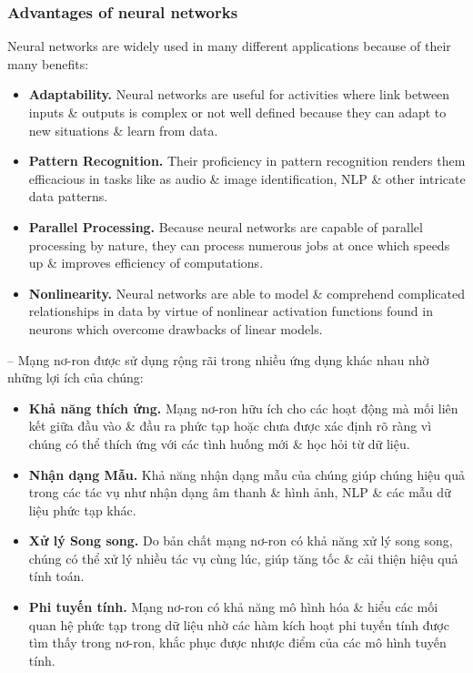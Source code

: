 \documentclass{article}
\begin{document}
\subsubsection{Advantages of neural networks}
Neural networks are widely used in many different applications because of their many benefits:
\begin{itemize}
    \item {\bf Adaptability.} Neural networks are useful for activities where link between inputs \& outputs is complex or not well defined because they can adapt to new situations \& learn from data.
    \item {\bf Pattern Recognition.} Their proficiency in pattern recognition renders them efficacious in tasks like as audio \& image identification, NLP \& other intricate data patterns.
    \item {\bf Parallel Processing.} Because neural networks are capable of parallel processing by nature, they can process numerous jobs at once which speeds up \& improves efficiency of computations.
    \item {\bf Nonlinearity.} Neural networks are able to model \& comprehend complicated relationships in data by virtue of nonlinear activation functions found in neurons which overcome drawbacks of linear models.
\end{itemize}
-- Mạng nơ-ron được sử dụng rộng rãi trong nhiều ứng dụng khác nhau nhờ những lợi ích của chúng:
\begin{itemize}
    \item {\bf Khả năng thích ứng.} Mạng nơ-ron hữu ích cho các hoạt động mà mối liên kết giữa đầu vào \& đầu ra phức tạp hoặc chưa được xác định rõ ràng vì chúng có thể thích ứng với các tình huống mới \& học hỏi từ dữ liệu.
    \item {\bf Nhận dạng Mẫu.} Khả năng nhận dạng mẫu của chúng giúp chúng hiệu quả trong các tác vụ như nhận dạng âm thanh \& hình ảnh, NLP \& các mẫu dữ liệu phức tạp khác.
    \item {\bf Xử lý Song song.} Do bản chất mạng nơ-ron có khả năng xử lý song song, chúng có thể xử lý nhiều tác vụ cùng lúc, giúp tăng tốc \& cải thiện hiệu quả tính toán.
    \item {\bf Phi tuyến tính.} Mạng nơ-ron có khả năng mô hình hóa \& hiểu các mối quan hệ phức tạp trong dữ liệu nhờ các hàm kích hoạt phi tuyến tính được tìm thấy trong nơ-ron, khắc phục được nhược điểm của các mô hình tuyến tính.
\end{itemize}

\end{document}
